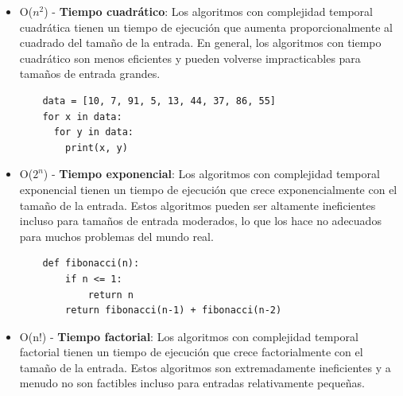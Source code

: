 \documentclass[xcolor=table]{beamer}
\begin{document}
\begin{frame} [fragile] \footnotesize

\begin{itemize}
      \item O($n^2$) - \textbf{Tiempo cuadrático}: Los algoritmos con complejidad temporal cuadrática tienen un tiempo de ejecución que aumenta proporcionalmente al cuadrado del tamaño de la entrada. En general, los algoritmos con tiempo cuadrático son menos eficientes y pueden volverse impracticables para tamaños de entrada grandes.
    
    \begin{verbatim}
    data = [10, 7, 91, 5, 13, 44, 37, 86, 55]
    for x in data:
      for y in data:
        print(x, y)
    \end{verbatim}


        
    \item O($2^n$) - \textbf{Tiempo exponencial}: Los algoritmos con complejidad temporal exponencial tienen un tiempo de ejecución que crece exponencialmente con el tamaño de la entrada. Estos algoritmos pueden ser altamente ineficientes incluso para tamaños de entrada moderados, lo que los hace no adecuados para muchos problemas del mundo real.

    \begin{verbatim}
    def fibonacci(n):
        if n <= 1:
            return n
        return fibonacci(n-1) + fibonacci(n-2)
    \end{verbatim}

    
\end{itemize}
\end{frame} 

\begin{frame} [fragile] \footnotesize

\begin{itemize}
    
    \item O(n!) - \textbf{Tiempo factorial}: Los algoritmos con complejidad temporal factorial tienen un tiempo de ejecución que crece factorialmente con el tamaño de la entrada. Estos algoritmos son extremadamente ineficientes y a menudo no son factibles incluso para entradas relativamente pequeñas.  
\end{itemize}
\end{frame} 
    
\end{document}
